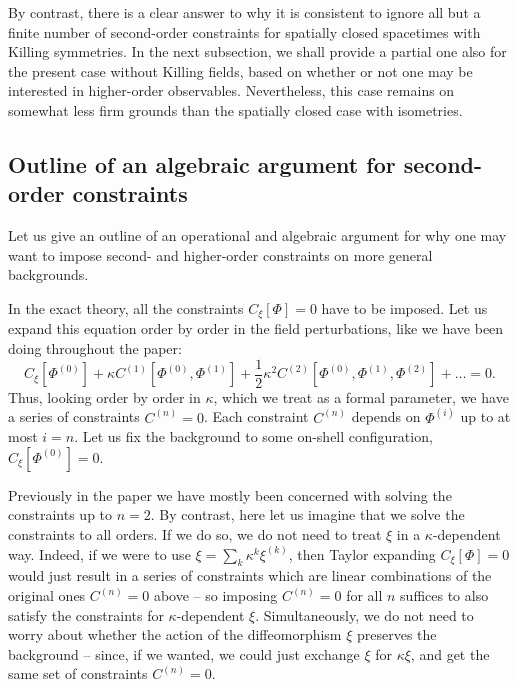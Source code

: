 \documentclass[]{jkpaper}
\theoremstyle{plain}
\theoremstyle{definition}
\begin{document}
By contrast, there is a clear answer to why it is consistent to ignore all but a finite number of second-order constraints for spatially closed spacetimes with Killing symmetries. In the next subsection, we shall provide a partial one also for the present case without Killing fields, based on whether or not one may be interested in higher-order observables. Nevertheless, this case remains on somewhat less firm grounds than the spatially closed case with isometries. 






\subsection{Outline of an algebraic argument for second-order constraints}

Let us give an outline of an operational and algebraic argument for why one may want to impose second- and  higher-order constraints on more general backgrounds.

In the exact theory, all the constraints $C_\xi[\Phi]=0$ have to be imposed. Let us expand this equation order by order in the field perturbations, like we have been doing throughout the paper:
\begin{equation}
    C_\xi[\Phi^{(0)}] + \kappa C^{(1)}[\Phi^{(0)},\Phi^{(1)}] + \frac12\kappa^2 C^{(2)}[\Phi^{(0)},\Phi^{(1)},\Phi^{(2)}] + \dots = 0.
\end{equation}
Thus, looking order by order in $\kappa$, which we treat as a formal parameter, we have a series of constraints $C^{(n)}=0$. Each constraint $C^{(n)}$ depends on $\Phi^{(i)}$ up to at most $i=n$. Let us fix the background to some on-shell configuration, $C_\xi[\Phi^{(0)}]=0$.

Previously in the paper we have mostly been concerned with solving the constraints up to $n=2$. By contrast, here let us imagine that we solve the constraints to all orders. If we do so, we do not need to treat $\xi$ in a $\kappa$-dependent way. Indeed, if we were to use $\xi = \sum_k \kappa^k \xi^{(k)}$, then Taylor expanding $C_\xi[\Phi]=0$ would just result in a series of constraints which are linear combinations of the original ones $C^{(n)}=0$ above -- so imposing $C^{(n)}=0$ for all $n$ suffices to also satisfy the constraints for $\kappa$-dependent $\xi$. Simultaneously, we do not need to worry about whether the action of the diffeomorphism $\xi$ preserves the background -- since, if we wanted, we could just exchange $\xi$ for $\kappa\xi$, and get the same set of constraints $C^{(n)}=0$.
\end{document}
